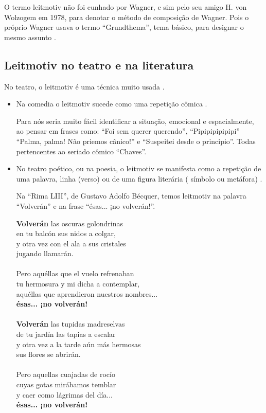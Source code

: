 O termo leitmotiv não foi cunhado por Wagner, 
e sim pelo seu amigo H. von Wolzogem em 1978, 
para denotar o método de composição de Wagner.
Pois o próprio Wagner usava o termo ``Grundthema'', tema básico,
para designar o mesmo assunto \cite[pp. 465]{apel1969harvard}.



\subsection{Leitmotiv no teatro e na  literatura}

No teatro, o leitmotiv é uma técnica muito usada  \cite[pp. 197]{pavis1998dictionary}.
\begin{itemize}
\item Na comedia o leitmotiv sucede como uma repetição cômica \cite[pp. 197]{pavis1998dictionary}.
\begin{example}
Para nós seria muito fácil identificar a situação, emocional e espacialmente,
ao pensar em frases como: 
``Foi sem querer querendo'',
``Pipipipipipipi'' 
``Palma, palma! Não priemos cânico!'' e 
``Suspeitei desde o principio''.
Todas pertencentes ao seriado cômico ``Chaves''.
\end{example} 
\item No teatro poético, ou na poesia, o leitmotiv se manifesta como a repetição de uma palavra, 
linha (verso) ou de uma figura literária ( símbolo ou metáfora) \cite[pp. 197]{pavis1998dictionary}.
\begin{example}
Na ``Rima LIII'', de Gustavo Adolfo Bécquer, temos leitmotiv na palavra ``Volverán''
e na frase ``ésas... ¡no volverán!''.
\end{example}
\begin{citando}
\textbf{Volverán} las oscuras golondrinas\\
en tu balcón sus nidos a colgar,\\
y otra vez con el ala a sus cristales\\
jugando llamarán.\\
\\
Pero aquéllas que el vuelo refrenaban\\
tu hermosura y mi dicha a contemplar,\\
aquéllas que aprendieron nuestros nombres...\\
\textbf{ésas... ¡no volverán!}\\
\\
\textbf{Volverán} las tupidas madreselvas\\
de tu jardín las tapias a escalar\\
y otra vez a la tarde aún más hermosas\\
sus flores se abrirán.\\
\\
Pero aquellas cuajadas de rocío\\
cuyas gotas mirábamos temblar\\
y caer como lágrimas del día...\\
\textbf{ésas... ¡no volverán!}\\
\end{citando}
\end{itemize}

